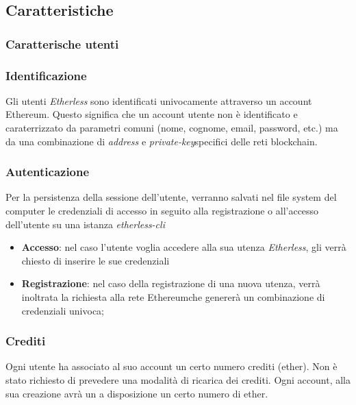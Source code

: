 \subsection{Caratteristiche}
\subsubsection{Caratterische utenti}
\subsubsection{Identificazione}
Gli utenti \textit{Etherless} sono identificati univocamente attraverso un account Ethereum\glo. Questo significa che un account utente non è identificato e caraterrizzato da parametri comuni (nome, cognome, email, password, etc.) ma da una combinazione di \textit{address} e \textit{private-key}\glo specifici delle reti blockchain.
\subsubsection{Autenticazione}
Per la persistenza della sessione dell'utente, verranno salvati nel file system del computer le credenziali di accesso in seguito alla registrazione o all'accesso dell'utente su una istanza \textit{etherless-cli}
\begin{itemize}
	\item \textbf{Accesso}: nel caso l'utente voglia accedere alla sua utenza \textit{Etherless}, gli verrà chiesto di inserire le sue credenziali
	\item \textbf{Registrazione}: nel caso della registrazione di una nuova utenza, verrà inoltrata la richiesta alla rete Ethereum\glo che genererà un combinazione di credenziali univoca;
\end{itemize}
\subsubsection{Crediti}
Ogni utente ha associato al suo account un certo numero crediti (ether\glo). Non è stato richiesto di prevedere una modalità di ricarica dei crediti. Ogni account, alla sua creazione avrà un a disposizione un certo numero di ether\glo.

